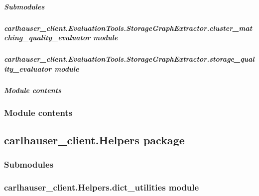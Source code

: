 \documentclass[letterpaper,10pt,english]{sphinxmanual}
\begin{document}
\subparagraph{Submodules}
\label{\detokenize{carlhauser_client.EvaluationTools.StorageGraphExtractor:submodules}}

\subparagraph{carlhauser\_client.EvaluationTools.StorageGraphExtractor.cluster\_matching\_quality\_evaluator module}
\label{\detokenize{carlhauser_client.EvaluationTools.StorageGraphExtractor:carlhauser-client-evaluationtools-storagegraphextractor-cluster-matching-quality-evaluator-module}}

\subparagraph{carlhauser\_client.EvaluationTools.StorageGraphExtractor.storage\_quality\_evaluator module}
\label{\detokenize{carlhauser_client.EvaluationTools.StorageGraphExtractor:carlhauser-client-evaluationtools-storagegraphextractor-storage-quality-evaluator-module}}

\subparagraph{Module contents}
\label{\detokenize{carlhauser_client.EvaluationTools.StorageGraphExtractor:module-carlhauser_client.EvaluationTools.StorageGraphExtractor}}\label{\detokenize{carlhauser_client.EvaluationTools.StorageGraphExtractor:module-contents}}

\subsubsection{Module contents}
\label{\detokenize{carlhauser_client.EvaluationTools:module-carlhauser_client.EvaluationTools}}\label{\detokenize{carlhauser_client.EvaluationTools:module-contents}}

\subsection{carlhauser\_client.Helpers package}
\label{\detokenize{carlhauser_client.Helpers:carlhauser-client-helpers-package}}\label{\detokenize{carlhauser_client.Helpers::doc}}

\subsubsection{Submodules}
\label{\detokenize{carlhauser_client.Helpers:submodules}}

\subsubsection{carlhauser\_client.Helpers.dict\_utilities module}
\label{\detokenize{carlhauser_client.Helpers:carlhauser-client-helpers-dict-utilities-module}}
\end{document}
